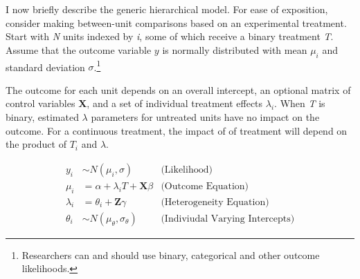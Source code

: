 \documentclass[12pt]{article}
\begin{document}
I now briefly describe the generic hierarchical model. 
For ease of exposition, consider making between-unit comparisons based on an experimental treatment.    
Start with \textit{N} units indexed by \textit{i}, some of which receive a binary treatment \textit{T}.
Assume that the outcome variable ${y}$ is normally distributed with mean $\mu_i$ and standard deviation $\sigma$.\footnote{Researchers can and should use binary, categorical and other outcome likelihoods.}


The outcome for each unit depends on an overall intercept, an optional matrix of control variables \textbf{X}, and a set of individual treatment effects $\lambda_i$.
When \textit{T} is binary, estimated $\lambda$ parameters for untreated units have no impact on the outcome. 
For a continuous treatment, the impact of of treatment will depend on the product of $\textit{T}_i$ and $\lambda$.



\begin{align*}
y_i &\sim N(\mu_i, \sigma) &\text{(Likelihood)} \\
\mu_i &= \alpha + \lambda_i \textit{T} + \textbf{X} \beta &\text{(Outcome Equation)}  \\ 
\lambda_i &= \theta_i + \textbf{Z} \gamma  &\text{(Heterogeneity Equation)}\\
\theta_i &\sim N(\mu_\theta, \sigma_\theta) &\text{(Indiviudal Varying Intercepts)} 
\end{align*}



\end{document}
